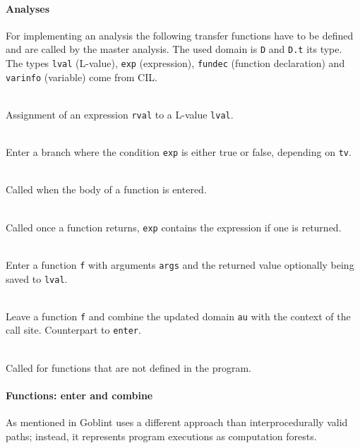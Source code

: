 \paragraph*{Analyses}
For implementing an analysis the following transfer functions have to be defined and are called by the master analysis. The used domain is \verb|D| and \verb|D.t| its type. The types \verb|lval| (L-value), \verb|exp| (expression), \verb|fundec| (function declaration) and \verb|varinfo| (variable) come from CIL.
\begin{description}
\item {}\\
Assignment of an expression \verb|rval| to a L-value \verb|lval|.

\item {}\\
Enter a branch where the condition \verb|exp| is either true or false, depending on \verb|tv|.

\item {}\\
Called when the body of a function is entered.

\item {}\\
Called once a function returns, \verb|exp| contains the expression if one is returned.

\item {}\\
Enter a function \verb|f| with arguments \verb|args| and the returned value optionally being saved to \verb|lval|.

\item {}\\
Leave a function \verb|f| and combine the updated domain \verb|au| with the context of the call site. Counterpart to \verb|enter|.

\item {}\\
Called for functions that are not defined in the program.
\end{description}

\paragraph*{Functions: enter and combine}
As mentioned in  Goblint uses a different approach than interprocedurally valid paths; instead, it represents program executions as computation forests.

